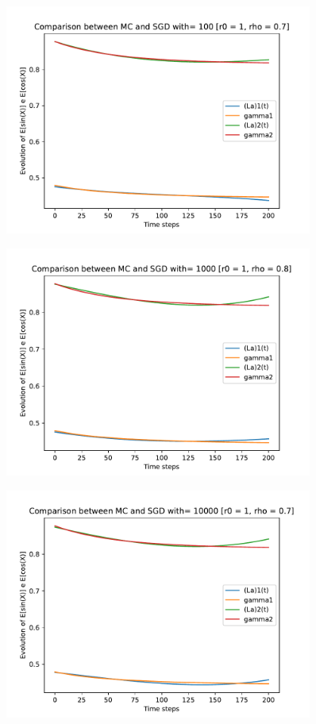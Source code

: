 \documentclass[a4paper,11pt,openright]{report}
\begin{document}
\begin{figure}[H]
\centering
\includegraphics[width=0.9\textwidth]{images/graphics T = 2/n = 3, M = 100 sine and cosine.pdf}
\end{figure}
\begin{figure}[H]
\centering
\includegraphics[width=0.9\textwidth]{images/graphics T = 2/n = 3, M = 1000 sine and cosine.pdf}
\end{figure}
\begin{figure}[H]
\centering
\includegraphics[width=0.9\textwidth]{images/graphics T = 2/n = 3, M = 10000 sine and cosine.pdf}
\end{figure}
\newpage
\end{document}
